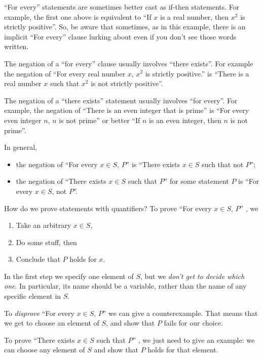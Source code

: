 \documentclass[12pt]{amsart}
\numberwithin{equation}{section}
\theoremstyle{plain} %
\theoremstyle{definition}
\theoremstyle{remark}
\begin{document}
``For every'' statements are sometimes better cast as if-then statements. For example, the first
one above is equivalent to ``If $x$ is a real number, then $x^2$ is strictly positive''.  So, be aware that sometimes, as in this example, there is an implicit
``For every'' clause lurking about even if you don't see those words written. 

The negation of a ``for every'' clause usually involves ``there exists''.
For example the negation of ``For every real number $x$, $x^2$ is strictly positive.''  is ``There is a real number $x$ such that $x^2$ is
not strictly positive''.

The negation of a ``there exists'' statement usually involves ``for every''. For example, 
the negation of ``There is an even integer that is prime'' is ``For every even integer $n$, $n$ is not prime'' or better ``If $n$ is an even integer, then $n$ is
not prime''.

 In general,  
 \begin{itemize}
 		\item the negation of ``For every $x \in S$, $P$''  is ``There exists  $x \in S$ such that not $P$'';
 	\item the negation of ``There exists $x \in S$ such that $P$'' for some statement $P$ is ``For every  $x \in S$, not $P$''.
 \end{itemize}

How do we prove statements with quantifiers? To prove ``For every $x \in S$, $P$'' , we
\begin{enumerate}
	\item Take an arbitrary $x\in S$,
	\item Do some stuff, then
	\item Conclude that $P$ holds for $x$.
\end{enumerate}
In the first step we specify one element of $S$, but we \textit{don't get to decide which one}. In particular, its name should be a variable, rather than the name of any specific element in $S$.

 To \textit{disprove} ``For every $x \in S$, $P$'' we can give a counterexample. That means that we get to choose an element of $S$, and show that $P$ fails for our choice.

To prove ``There exists $x \in S$ such that $P$'' , we just need to give an example: we can choose any element of $S$ and show that $P$ holds for that element.
\end{document}
